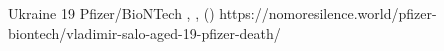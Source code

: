           {Ukraine}
          {19}
          {Pfizer/BioNTech}
          {}
          {
            ,
            ,
             ()
          }
          {https://nomoresilence.world/pfizer-biontech/vladimir-salo-aged-19-pfizer-death/}


